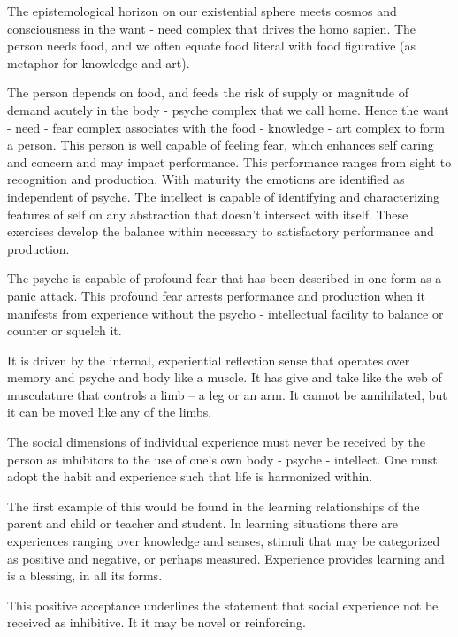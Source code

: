 

The epistemological horizon on our existential sphere meets cosmos and
consciousness in the want - need complex that drives the homo sapien.
The person needs food, and we often equate food literal with food
figurative (as metaphor for knowledge and art).  

The person depends on food, and feeds the risk of supply or magnitude
of demand acutely in the body - psyche complex that we call home.
Hence the want - need - fear complex associates with the food -
knowledge - art complex to form a person.  This person is well capable
of feeling fear, which enhances self caring and concern and may impact
performance.  This performance ranges from sight to recognition and
production.  With maturity the emotions are identified as independent
of psyche.  The intellect is capable of identifying and characterizing
features of self on any abstraction that doesn't intersect with
itself.  These exercises develop the balance within necessary to
satisfactory performance and production.

The psyche is capable of profound fear that has been described in one
form as a panic attack.  This profound fear arrests performance and
production when it manifests from experience without the psycho -
intellectual facility to balance or counter or squelch it.  

It is driven by the internal, experiential reflection sense that
operates over memory and psyche and body like a muscle.  It has give
and take like the web of musculature that controls a limb -- a leg or
an arm.  It cannot be annihilated, but it can be moved like any of the
limbs.

The social dimensions of individual experience must never be received
by the person as inhibitors to the use of one's own body - psyche -
intellect.  One must adopt the habit and experience such that life is
harmonized within.  

The first example of this would be found in the learning relationships
of the parent and child or teacher and student.  In learning
situations there are experiences ranging over knowledge and senses,
stimuli that may be categorized as positive and negative, or perhaps
measured.  Experience provides learning and is a blessing, in all its
forms.  

This positive acceptance underlines the statement that social
experience not be received as inhibitive.  It it may be novel or
reinforcing.

\bye
